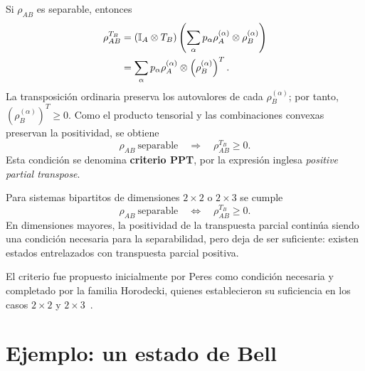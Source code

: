 \documentclass[../main.tex]{subfiles}
\begin{document}
Si $\rho_{AB}$ es separable, entonces
\begin{align*}
    \rho_{AB}^{T_B}
    &=\left(\mathbb{I}_A\otimes T_B\right)
    \left(
        \sum_{\alpha}p_{\alpha}
        \rho_A^{(\alpha)}\otimes\rho_B^{(\alpha)}
    \right)\\
    &=\sum_{\alpha}p_{\alpha}
        \rho_A^{(\alpha)}\otimes
        \left(\rho_B^{(\alpha)}\right)^T.
\end{align*}
La transposición ordinaria preserva los autovalores de cada $\rho_B^{(\alpha)}$; por tanto, $\left(\rho_B^{(\alpha)}\right)^T\geq 0$. Como el producto tensorial y las combinaciones convexas preservan la positividad, se obtiene
\begin{equation*}
    \rho_{AB}\ \text{separable}
    \quad\Longrightarrow\quad
    \rho_{AB}^{T_B}\geq 0.
\end{equation*}
Esta condición se denomina \textbf{criterio PPT}, por la expresión inglesa \emph{positive partial transpose}.

\begin{teorema}
Para sistemas bipartitos de dimensiones $2\times 2$ o $2\times 3$ se cumple
\begin{equation*}
    \rho_{AB}\ \text{separable}
    \quad\Longleftrightarrow\quad
    \rho_{AB}^{T_B}\geq 0.
\end{equation*}
En dimensiones mayores, la positividad de la transpuesta parcial continúa siendo una condición necesaria para la separabilidad, pero deja de ser suficiente: existen estados entrelazados con transpuesta parcial positiva.
\end{teorema}

El criterio fue propuesto inicialmente por Peres como condición necesaria y completado por la familia Horodecki, quienes establecieron su suficiencia en los casos $2\times 2$ y $2\times 3$~\cite{Peres1996,Horodecki1996}.

\section{Ejemplo: un estado de Bell}
\end{document}
